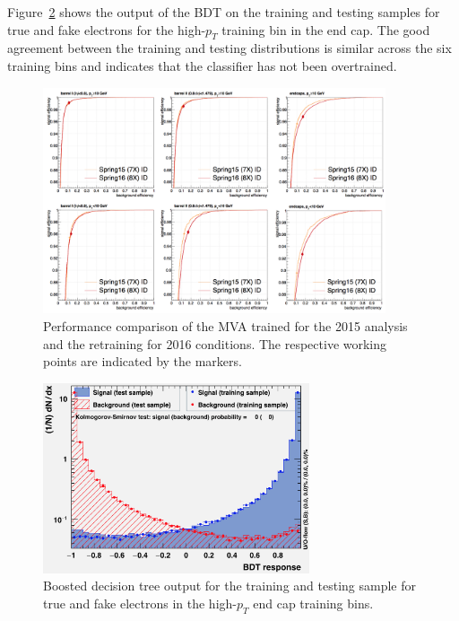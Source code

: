 Figure~\ref{fig:ele_ID_BDT_output} shows the output of the BDT on the training and testing samples for true and fake electrons 
for the high-$p_T$ training bin in the end cap. 
The good agreement between the training and testing distributions is similar across the six training bins and indicates that the classifier has not been overtrained.

\begin{figure}[!htb]
\vspace*{0.3cm}
\begin{center}
\includegraphics[width=0.9\textwidth]{Figures/Electrons/ele_ROC.png}
\caption{Performance comparison of the MVA trained for the 2015 analysis and the retraining for 2016 conditions. 
The respective working points are indicated by the markers.
\label{fig:ele_ID_ROC}}
\end{center}
\end{figure}

\begin{figure}[!htb]
\vspace*{0.3cm}
\begin{center}
\includegraphics[width=0.7\textwidth]{Figures/Electrons/ele_overtraining.png}
\caption{Boosted decision tree output for the training and testing sample for true and fake electrons in the high-$p_T$ end cap training bins.
\label{fig:ele_ID_BDT_output}}
\end{center}
\end{figure}

